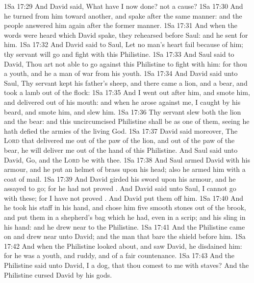 \vs 1Sa 17:29 And David said, What have I now done?  not a cause?
\vs 1Sa 17:30 And he turned from him toward another, and spake after the same manner: and the people answered him again after the former manner.
\vs 1Sa 17:31 And when the words were heard which David spake, they rehearsed  before Saul: and he sent for him.
\vs 1Sa 17:32 And David said to Saul, Let no man's heart fail because of him; thy servant will go and fight with this Philistine.
\vs 1Sa 17:33 And Saul said to David, Thou art not able to go against this Philistine to fight with him: for thou  a youth, and he a man of war from his youth.
\vs 1Sa 17:34 And David said unto Saul, Thy servant kept his father's sheep, and there came a lion, and a bear, and took a lamb out of the flock:
\vs 1Sa 17:35 And I went out after him, and smote him, and delivered  out of his mouth: and when he arose against me, I caught  by his beard, and smote him, and slew him.
\vs 1Sa 17:36 Thy servant slew both the lion and the bear: and this uncircumcised Philistine shall be as one of them, seeing he hath defied the armies of the living God.
\vs 1Sa 17:37 David said moreover, The \textsc{Lord} that delivered me out of the paw of the lion, and out of the paw of the bear, he will deliver me out of the hand of this Philistine. And Saul said unto David, Go, and the \textsc{Lord} be with thee.
\vs 1Sa 17:38 And Saul armed David with his armour, and he put an helmet of brass upon his head; also he armed him with a coat of mail.
\vs 1Sa 17:39 And David girded his sword upon his armour, and he assayed to go; for he had not proved . And David said unto Saul, I cannot go with these; for I have not proved . And David put them off him.
\vs 1Sa 17:40 And he took his staff in his hand, and chose him five smooth stones out of the brook, and put them in a shepherd's bag which he had, even in a scrip; and his sling  in his hand: and he drew near to the Philistine.
\vs 1Sa 17:41 And the Philistine came on and drew near unto David; and the man that bare the shield  before him.
\vs 1Sa 17:42 And when the Philistine looked about, and saw David, he disdained him: for he was  a youth, and ruddy, and of a fair countenance.
\vs 1Sa 17:43 And the Philistine said unto David,  I a dog, that thou comest to me with staves? And the Philistine cursed David by his gods.
